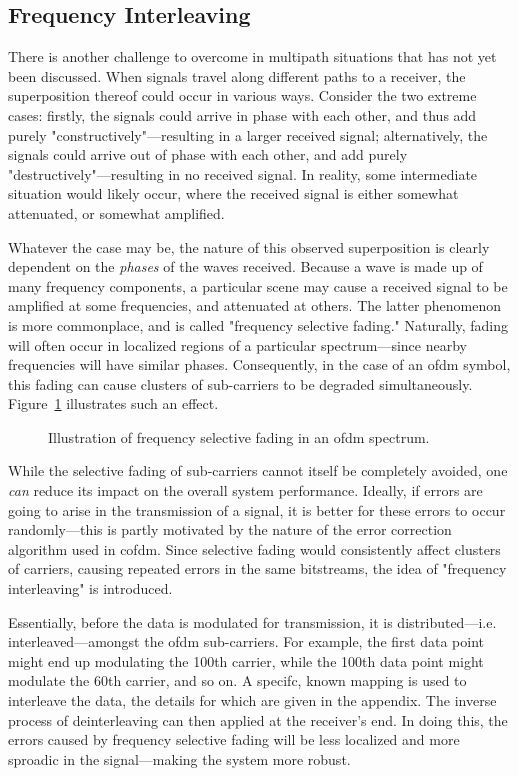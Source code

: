 \documentclass[class=report,11pt,crop=false]{standalone}
\begin{document}
\subsection{Frequency Interleaving}
There is another challenge to overcome in multipath situations that has not yet been discussed. When signals travel along different paths to a receiver, the superposition thereof could occur in various ways. Consider the two extreme cases: firstly, the signals could arrive in phase with each other, and thus add purely "constructively"---resulting in a larger received signal; alternatively, the signals could arrive out of phase with each other, and add purely "destructively"---resulting in no received signal. In reality, some intermediate situation would likely occur, where the received signal is either somewhat attenuated, or somewhat amplified.

Whatever the case may be, the nature of this observed superposition is clearly dependent on the \emph{phases} of the waves received. Because a wave is made up of many frequency components, a particular scene may cause a received signal to be amplified at some frequencies, and attenuated at others. The latter phenomenon is more commonplace, and is called "frequency selective fading." Naturally, fading will often occur in localized regions of a particular spectrum---since nearby frequencies will have similar phases. Consequently, in the case of an \gls{ofdm} symbol, this fading can cause clusters of sub-carriers to be degraded simultaneously. Figure~\ref{fig:ofdm-selective-fading} illustrates such an effect.
\begin{figure}[htbp]
    \centering
    \captionsetup{type=figure}
    \def\svgwidth{1\linewidth}
    { %
        }
    \caption{Illustration of frequency selective fading in an \gls{ofdm} spectrum.}
    \label{fig:ofdm-selective-fading}
\end{figure}
While the selective fading of sub-carriers cannot itself be completely avoided, one \emph{can} reduce its impact on the overall system performance. Ideally, if errors are going to arise in the transmission of a signal, it is better for these errors to occur randomly---this is partly motivated by the nature of the error correction algorithm used in \gls{cofdm}. Since selective fading would consistently affect clusters of carriers, causing repeated errors in the same bitstreams, the idea of "frequency interleaving" is introduced.

Essentially, before the data is modulated for transmission, it is distributed---i.e. interleaved---amongst the \gls{ofdm} sub-carriers. For example, the first data point might end up modulating the 100th carrier, while the 100th data point might modulate the 60th carrier, and so on. A specifc, known mapping is used to interleave the data, the details for which are given in the appendix. The inverse process of deinterleaving can then applied at the receiver's end. In doing this, the errors caused by frequency selective fading will be less localized and more sproadic in the signal---making the system more robust.
\end{document}
